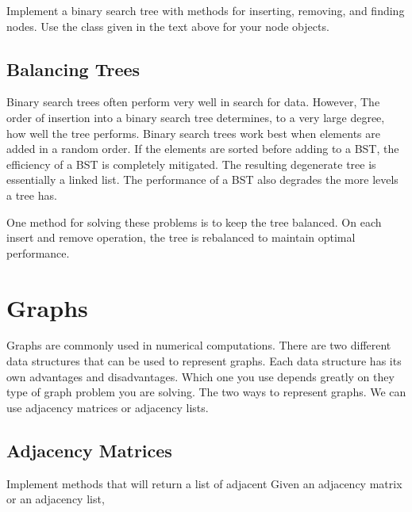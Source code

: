 \begin{problem}
Implement a binary search tree with methods for inserting, removing, and finding nodes.
Use the  class given in the text above for your node objects.
\end{problem}

\subsection*{Balancing Trees}
Binary search trees often perform very well in search for data.
However, The order of insertion into a binary search tree determines, to a very large degree, how well the tree performs.
Binary search trees work best when elements are added in a random order.
If the elements are sorted before adding to a BST, the efficiency of a BST is completely mitigated.  The resulting degenerate tree is essentially a linked list.
The performance of a BST also degrades the more levels a tree has. 

One method for solving these problems is to keep the tree balanced.
On each insert and remove operation, the tree is rebalanced to maintain optimal performance.
 


\section*{Graphs}
Graphs are commonly used in numerical computations.
There are two different data structures that can be used to represent graphs.
Each data structure has its own advantages and disadvantages.
Which one you use depends greatly on they type of graph problem you are solving.
The two ways to represent graphs.  We can use adjacency matrices or adjacency lists.

\subsection*{Adjacency Matrices}


\begin{problem}
Implement methods that will return a list of adjacent 
Given an adjacency matrix or an adjacency list, 
\end{problem}